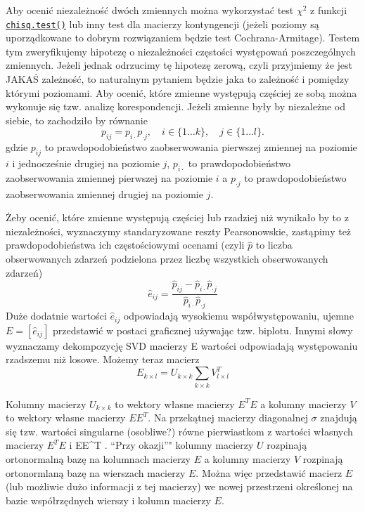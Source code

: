 \documentclass[polish,]{book}
\begin{document}
Aby ocenić niezależność dwóch zmiennych można wykorzystać test \(\chi^2\) z funkcji
\href{https://rdrr.io/r/stats/chisq.test.html}{\texttt{chisq.test()}} lub inny test dla macierzy kontyngencji (jeżeli poziomy są uporządkowane to dobrym rozwiązaniem będzie test Cochrana-Armitage). Testem tym zweryfikujemy hipotezę o niezależności częstości występowań poszczególnych zmiennych.
Jeżeli jednak odrzucimy tę hipotezę zerową, czyli przyjmiemy że jest JAKAŚ
zależność, to naturalnym pytaniem będzie jaka to zależność i pomiędzy którymi
poziomami.
Aby ocenić, które zmienne występują częściej ze sobą można wykonuje się tzw.
analizę korespondencji. Jeżeli zmienne były by niezależne od siebie, to zachodziło
by równanie
\[
p_{ij}=p_{i\cdot}p_{\cdot j},\quad i\in \{1\dots k\},\quad j\in \{1\dots l\}.
\]
gdzie \(p_{ij}\) to prawdopodobieństwo zaobserwowania pierwszej zmiennej na poziomie
\(i\) i jednocześnie drugiej na poziomie \(j\), \(p_{i\cdot}\) to prawdopodobieństwo zaobserwowania zmiennej pierwszej na poziomie \(i\) a \(p_{\cdot j}\) to prawdopodobieństwo zaobserwowania zmiennej drugiej na poziomie \(j\).

Żeby ocenić, które zmienne występują częściej lub rzadziej niż wynikało by to
z niezależności, wyznaczymy standaryzowane reszty Pearsonowskie, zastąpimy też
prawdopodobieństwa ich częstościowymi ocenami (czyli \(\hat{p}\)
to liczba obserwowanych
zdarzeń podzielona przez liczbę wszystkich obserwowanych zdarzeń)
\[
\hat{e}_{ij}=\frac{\hat{p}_{ij}-\hat{p}_{i\cdot}\hat{p}_{\cdot j}}{\hat{p}_{i\cdot}\hat{p}_{\cdot j}}
\]
Duże dodatnie wartości \(\hat{e}_{ij}\) odpowiadają wysokiemu współwystępowaniu, ujemne \(E=[\hat{e}_{ij}]\) przedstawić w postaci graficznej używając tzw. biplotu. Innymi słowy wyznaczamy dekompozycję SVD macierzy E
wartości odpowiadają występowaniu rzadszemu niż losowe. Możemy teraz macierz
\[
E_{k\times l}=U_{k\times k}\sum_{k\times k}V_{l \times l}^{T}
\]

Kolumny macierzy \(U_{k \times k}\) to wektory własne macierzy \(E^T E\) a kolumny macierzy \(V\)
to wektory własne macierzy \(EE^T\). Na przekątnej macierzy diagonalnej \(\sigma\) znajdują
się tzw. wartości singularne (osobliwe?) równe pierwiastkom z wartości własnych
macierzy \(E^TE\) i EE\^{}T . ``Przy okazji''" kolumny macierzy \(U\) rozpinają ortonormalną
bazę na kolumnach macierzy \(E\) a kolumny macierzy \(V\) rozpinają ortonormlaną bazę
na wierszach macierzy \(E\). Można więc przedstawić macierz \(E\) (lub możliwie dużo
informacji z tej macierzy) we nowej przestrzeni określonej na bazie współrzędnych
wierszy i kolumn macierzy \(E\).
\end{document}
